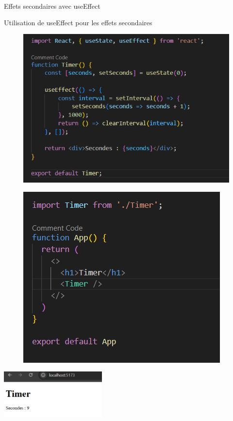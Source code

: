 \documentclass{clbeamer2024}
\begin{document}
\begin{frame}{Effets secondaires avec useEffect}
\begin{exampleblock}{Utilisation de useEffect pour les effets secondaires}
			\begin{figure}[h] %
				\centering
				\begin{minipage}{0.45\textwidth}
					\centering
					\includegraphics[width=\linewidth]{images/code5.png}
					\label{fig:image1}
				\end{minipage}
				\hfill %
				\begin{minipage}{0.4\textwidth}
					\centering
					\includegraphics[width=\linewidth]{images/code6.png}
					\label{fig:image2}
				\end{minipage}
			\end{figure}
			\centering
			\includegraphics[width=0.4\textwidth]{images/resultat3.png}
		
		\end{exampleblock}
	\end{frame}
	
\end{document}
